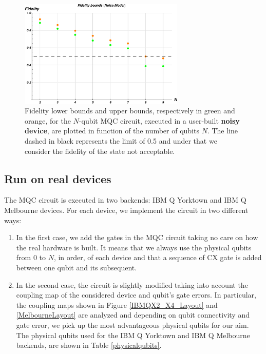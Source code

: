 \begin{figure}[h!]
\centering \includegraphics[width=0.7\textwidth]{./chapter3/graphics_IBM/simulation/NoiseModel_ibmq16melbourne.eps}
\caption{\label{F_NoiseModel_ibmq16melbourne} Fidelity lower bounds and upper bounds, respectively in green and orange, for the $N$-qubit MQC circuit, executed in a user-built \textbf{noisy device}, are plotted in function of the number of qubits $N$. The line dashed in black represents the limit of 0.5 and under that we consider the fidelity of the state not acceptable. }
\end{figure}


\newpage
\subsection{Run on real devices}

The MQC circuit is executed in two backends: IBM Q Yorktown and IBM Q Melbourne devices. For each device, we implement the circuit in two different ways:
\begin{enumerate}
\item In the first case, we add the gates in the MQC circuit taking no care on how the real hardware is built. It means that we always use the physical qubits from 0 to $N$, in order, of each device and that a sequence of CX gate is added between one qubit and its subsequent.

\item In the second case, the circuit is slightly modified taking into account the coupling map of the considered device and qubit's gate errors. In particular, the coupling maps shown in Figure \ref{IBMQX2_X4_Layout} and \ref{MelbourneLayout} are analyzed and depending on qubit connectivity and gate error,  we pick up the most advantageous physical qubits for our aim. The physical qubits used for the IBM Q Yorktown and IBM Q Melbourne backends, are shown in Table \ref{physicalqubits}.
\end{enumerate}


